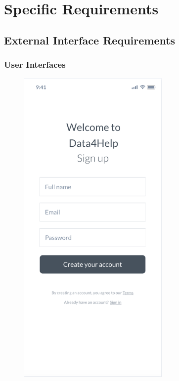\documentclass{article}
\begin{document}
\newpage
\section{Specific Requirements}

\subsection{External Interface Requirements}

	\subsubsection{User Interfaces} 	
	\begin{figure}[!h]
	 	\centering
		\includegraphics[height=16cm,keepaspectratio]{Figures/1SignUp}
	\end{figure}\newpage
	
\end{document}
